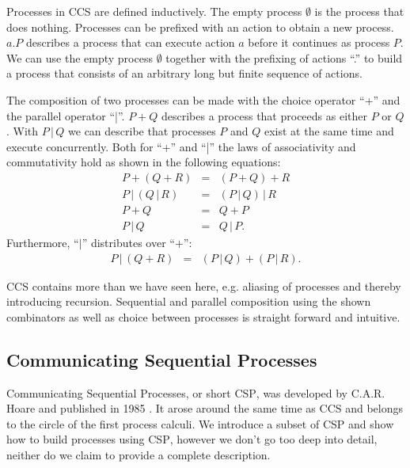 Processes in \textsc{CCS} are defined inductively. The empty process $\emptyset$ is the process that does nothing. Processes can be prefixed with an action to obtain a new process. $a.P$ describes a process that can execute action $a$ before it continues as process $P$. We can use the empty process $\emptyset$ together with the prefixing of actions \enquote{.} to build a process that consists of an arbitrary long but finite sequence of actions.

The composition of two processes can be made with the choice operator \enquote{+} and the parallel operator \enquote{|}. $P + Q$ describes a process that proceeds as either $P$ or $Q$. With $P \,|\, Q$ we can describe that processes $P$ and $Q$ exist at the same time and execute concurrently. Both for \enquote{+} and \enquote{|} the laws of associativity and commutativity hold as shown in the following equations:
\begin{eqnarray*}
  P + \left( Q + R \right) & = & \left( P + Q \right) + R \\
  P \,|\, \left( Q \,|\, R \right) & = & \left( P \,|\, Q \right) \,|\, R \\
  P + Q & = & Q + P \\
  P \,|\, Q & = & Q \,|\, P.
\end{eqnarray*}
Furthermore, \enquote{$|$} distributes over \enquote{$+$}:
\begin{eqnarray*}
  P \,|\, \left( Q + R \right) & = & \left( P \,|\, Q \right) + \left( P \,|\, R \right).
\end{eqnarray*}

\textsc{CCS} contains more than we have seen here, e.g. aliasing of processes and thereby introducing recursion. Sequential and parallel composition using the shown combinators as well as choice between processes is straight forward and intuitive.

\subsection{Communicating Sequential Processes}
Communicating Sequential Processes, or short \textsc{CSP}, was developed by C.A.R. Hoare and published in 1985 \cite{Hoare:1985:CSP:3921}. It arose around the same time as \textsc{CCS} and belongs to the circle of the first process calculi. We introduce a subset of \textsc{CSP} and show how to build processes using \textsc{CSP}, however we don't go too deep into detail, neither do we claim to provide a complete description.

